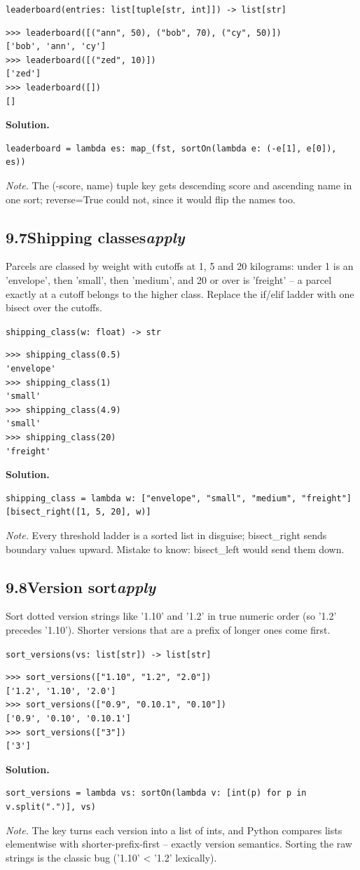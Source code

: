 \documentclass[10pt,letterpaper]{book}
\begin{document}
\noindent\texttt{leaderboard(entries: list[tuple[str, int]]) -> list[str]}
\begin{lstlisting}[style=ex]
>>> leaderboard([("ann", 50), ("bob", 70), ("cy", 50)])
['bob', 'ann', 'cy']
>>> leaderboard([("zed", 10)])
['zed']
>>> leaderboard([])
[]
\end{lstlisting}
\noindent\textbf{Solution.}
\begin{lstlisting}[style=code]
leaderboard = lambda es: map_(fst, sortOn(lambda e: (-e[1], e[0]), es))
\end{lstlisting}
\noindent\textit{Note.} The (-score, name) tuple key gets descending score and ascending name in one sort; reverse=True could not, since it would flip the names too.

\subsection*{9.7\quad Shipping classes\hfill\textnormal{\textit{apply}}}
Parcels are classed by weight with cutoffs at 1, 5 and 20 kilograms: under 1 is an 'envelope', then 'small', then 'medium', and 20 or over is 'freight' -- a parcel exactly at a cutoff belongs to the higher class. Replace the if/elif ladder with one bisect over the cutoffs.

\noindent\texttt{shipping\_class(w: float) -> str}
\begin{lstlisting}[style=ex]
>>> shipping_class(0.5)
'envelope'
>>> shipping_class(1)
'small'
>>> shipping_class(4.9)
'small'
>>> shipping_class(20)
'freight'
\end{lstlisting}
\noindent\textbf{Solution.}
\begin{lstlisting}[style=code]
shipping_class = lambda w: ["envelope", "small", "medium", "freight"][bisect_right([1, 5, 20], w)]
\end{lstlisting}
\noindent\textit{Note.} Every threshold ladder is a sorted list in disguise; bisect\_right sends boundary values upward. Mistake to know: bisect\_left would send them down.

\subsection*{9.8\quad Version sort\hfill\textnormal{\textit{apply}}}
Sort dotted version strings like '1.10' and '1.2' in true numeric order (so '1.2' precedes '1.10'). Shorter versions that are a prefix of longer ones come first.

\noindent\texttt{sort\_versions(vs: list[str]) -> list[str]}
\begin{lstlisting}[style=ex]
>>> sort_versions(["1.10", "1.2", "2.0"])
['1.2', '1.10', '2.0']
>>> sort_versions(["0.9", "0.10.1", "0.10"])
['0.9', '0.10', '0.10.1']
>>> sort_versions(["3"])
['3']
\end{lstlisting}
\noindent\textbf{Solution.}
\begin{lstlisting}[style=code]
sort_versions = lambda vs: sortOn(lambda v: [int(p) for p in v.split(".")], vs)
\end{lstlisting}
\noindent\textit{Note.} The key turns each version into a list of ints, and Python compares lists elementwise with shorter-prefix-first -- exactly version semantics. Sorting the raw strings is the classic bug ('1.10' < '1.2' lexically).
\end{document}
